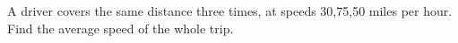 A driver covers the same distance three times, at speeds 30,75,50 miles per hour. Find the average speed of the whole trip.
